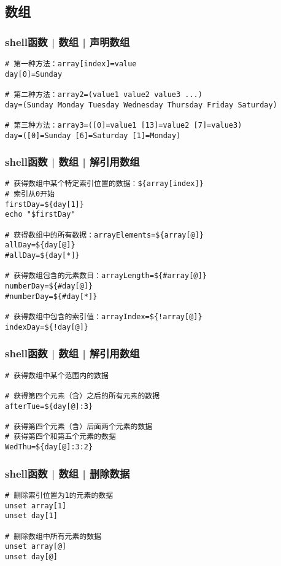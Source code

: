 \subsection{数组}
\begin{frame}[fragile]
  \frametitle{shell函数 | 数组 | 声明数组}
\begin{lstlisting}
# 第一种方法：array[index]=value
day[0]=Sunday

# 第二种方法：array2=(value1 value2 value3 ...)
day=(Sunday Monday Tuesday Wednesday Thursday Friday Saturday)

# 第三种方法：array3=([0]=value1 [13]=value2 [7]=value3)
day=([0]=Sunday [6]=Saturday [1]=Monday)
\end{lstlisting}
\end{frame}

\begin{frame}[fragile]
  \frametitle{shell函数 | 数组 | 解引用数组}
\begin{lstlisting}
# 获得数组中某个特定索引位置的数据：${array[index]}
# 索引从0开始
firstDay=${day[1]}
echo "$firstDay"

# 获得数组中的所有数据：arrayElements=${array[@]}
allDay=${day[@]}
#allDay=${day[*]}

# 获得数组包含的元素数目：arrayLength=${#array[@]}
numberDay=${#day[@]}
#numberDay=${#day[*]}

# 获得数组中包含的索引值：arrayIndex=${!array[@]}
indexDay=${!day[@]}
\end{lstlisting}
\end{frame}

\begin{frame}[fragile]
  \frametitle{shell函数 | 数组 | 解引用数组}
\begin{lstlisting}
# 获得数组中某个范围内的数据

# 获得第四个元素（含）之后的所有元素的数据
afterTue=${day[@]:3}

# 获得第四个元素（含）后面两个元素的数据
# 获得第四个和第五个元素的数据
WedThu=${day[@]:3:2}
\end{lstlisting}
\end{frame}

\begin{frame}[fragile]
  \frametitle{shell函数 | 数组 | 删除数据}
\begin{lstlisting}
# 删除索引位置为1的元素的数据
unset array[1]
unset day[1]

# 删除数组中所有元素的数据
unset array[@]
unset day[@]
\end{lstlisting}
\end{frame}

